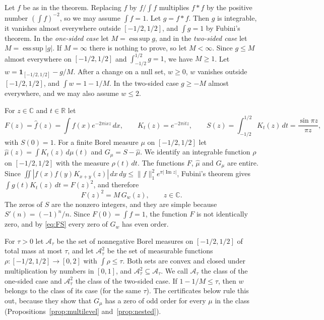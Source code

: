 \documentclass[11pt]{amsart}
\theoremstyle{definition}
\theoremstyle{remark}
\numberwithin{equation}{section}
\newcommand{\R}{\mathbb{R}}
\newcommand{\C}{\mathbb{C}}
\newcommand{\one}{\mathbf{1}}
\newcommand{\im}{\operatorname{Im}}
\newcommand{\esssup}{\operatorname*{ess\,sup}}
\begin{document}
Let $f$ be as in the theorem. Replacing $f$ by $f/\int f$ multiplies $f*f$ by the positive number $(\int f)^{-2}$, so we may assume $\int f=1$. Let $g=f*f$. Then $g$ is integrable, it vanishes almost everywhere outside $[-1/2,1/2]$, and $\int g=1$ by Fubini's theorem. In the \emph{one-sided case} let $M=\esssup g$, and in the \emph{two-sided case} let $M=\esssup|g|$. If $M=\infty$ there is nothing to prove, so let $M<\infty$. Since $g\le M$ almost everywhere on $[-1/2,1/2]$ and $\int_{-1/2}^{1/2}g=1$, we have $M\ge1$. Let $w=\one_{[-1/2,1/2]}-g/M$. After a change on a null set, $w\ge0$, $w$ vanishes outside $[-1/2,1/2]$, and $\int w=1-1/M$. In the two-sided case $g\ge-M$ almost everywhere, and we may also assume $w\le2$.

For $z\in\C$ and $t\in\R$ let
\[
F(z)=\hat f(z)=\int f(x)e^{-2\pi ixz}\,dx,\qquad K_t(z)=e^{-2\pi itz},\qquad S(z)=\int_{-1/2}^{1/2}K_t(z)\,dt=\frac{\sin\pi z}{\pi z},
\]
with $S(0)=1$. For a finite Borel measure $\mu$ on $[-1/2,1/2]$ let $\hat\mu(z)=\int K_t(z)\,d\mu(t)$ and $G_\mu=S-\hat\mu$. We identify an integrable function $\rho$ on $[-1/2,1/2]$ with the measure $\rho(t)\,dt$. The functions $F$, $\hat\mu$ and $G_\mu$ are entire. Since $\iint|f(x)f(y)K_{x+y}(z)|\,dx\,dy\le\|f\|_1^2e^{\pi|\im z|}$, Fubini's theorem gives $\int g(t)K_t(z)\,dt=F(z)^2$, and therefore
\begin{equation}\label{eq:FS}
F(z)^2=M\,G_w(z),\qquad z\in\C.
\end{equation}
The zeros of $S$ are the nonzero integers, and they are simple because $S'(n)=(-1)^n/n$. Since $F(0)=\int f=1$, the function $F$ is not identically zero, and by \eqref{eq:FS} every zero of $G_w$ has even order.

For $\tau>0$ let $\mathcal A_\tau$ be the set of nonnegative Borel measures on $[-1/2,1/2]$ of total mass at most $\tau$, and let $\mathcal A^2_\tau$ be the set of measurable functions $\rho\colon[-1/2,1/2]\to[0,2]$ with $\int\rho\le\tau$. Both sets are convex and closed under multiplication by numbers in $[0,1]$, and $\mathcal A^2_\tau\subseteq\mathcal A_\tau$. We call $\mathcal A_\tau$ the class of the one-sided case and $\mathcal A^2_\tau$ the class of the two-sided case. If $1-1/M\le\tau$, then $w$ belongs to the class of its case (for the same $\tau$). The certificates below rule this out, because they show that $G_\mu$ has a zero of odd order for every $\mu$ in the class (Propositions~\ref{prop:multilevel} and~\ref{prop:nested}).
\end{document}
